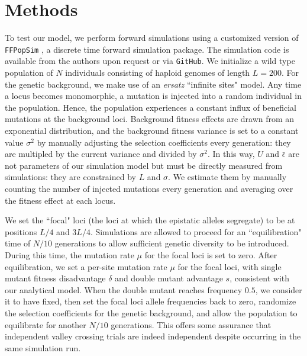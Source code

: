 \documentclass[rmp]{revtex4}
\begin{document}
\section*{Methods}

To test our model, we perform forward simulations using a customized version of \texttt{FFPopSim} \citep{zanini_2012}, a discrete time forward simulation package.
The simulation code is available from the authors upon request or via \texttt{GitHub}.
We initialize a wild type population of $N$ individuals consisting of haploid genomes of length $L = 200$.
For the genetic background, we make use of an \emph{ersatz} ``infinite sites" model.
Any time a locus becomes monomorphic, a mutation is injected into a random individual in the population.
Hence, the population experiences a constant influx of beneficial mutations at the background loci.
Background fitness effects are drawn from an exponential distribution, and the background fitness variance is set to a constant value $\sigma^2$ by manually adjusting the selection coefficients every generation: they are multipled by the current variance and divided by $\sigma^2$.
In this way, $U$ and $\bar{\epsilon}$ are not parameters of our simulation model but must be directly measured from simulations: they are constrained by $L$ and $\sigma$.
We estimate them by manually counting the number of injected mutations every generation and averaging over the fitness effect at each locus.

We set the ``focal" loci (the loci at which the epistatic alleles segregate) to be at positions $L/4$ and $3L/4$.
Simulations are allowed to proceed for an ``equilibration" time of $N/10$ generations to allow sufficient genetic diversity to be introduced.
During this time, the mutation rate $\mu$ for the focal loci is set to zero.
After equilibration, we set a per-site mutation rate $\mu$ for the focal loci, with single mutant fitness disadvantage $\delta$ and double mutant advantage $s$, consistent with our analytical model.
When the double mutant reaches frequency $0.5$, we consider it to have fixed, then set the focal loci allele frequencies back to zero, randomize the selection coefficients for the genetic background, and allow the population to equilibrate for another $N/10$ generations.
This offers some assurance that independent valley crossing trials are indeed independent despite occurring in the same simulation run.
\end{document}

